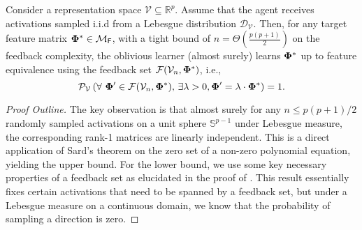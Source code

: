 
    

\begin{theorem}\label{thm: samplegeneral}
    Consider a representation space \( \mathcal{V} \subseteq \mathbb{R}^p \). Assume that the agent receives activations sampled i.i.d from a Lebesgue distribution \( \mathcal{D}_{\mathcal{V}} \). Then, for any target feature matrix \( \boldsymbol{\Phi}^* \in \mathcal{M}_{\textsf{F}} \), with a tight bound of \( n = \Theta\left(\frac{p(p+1)}{2}\right) \) on the feedback complexity, the oblivious learner (almost surely) learns \( \boldsymbol{\Phi}^* \) up to feature equivalence using the feedback set \( \mathcal{F}(\mathcal{V}_n,\boldsymbol{\Phi}^*) \), i.e.,
    \[
        \mathcal{P}_{\mathcal{V}} \left( \forall\,\, \boldsymbol{\Phi}' \in \mathcal{F}(\mathcal{V}_n,\boldsymbol{\Phi}^*),\, \exists \lambda > 0, \boldsymbol{\Phi}' = \lambda \cdot \boldsymbol{\Phi}^* \right) = 1.
    \]
\end{theorem}
\begin{proof}[Proof Outline] The key observation is that almost surely for any $n \le p(p+1)/2$ randomly sampled activations on a unit sphere $\mathbb{S}^{p-1}$ under Lebesgue measure, the corresponding rank-1 matrices are linearly independent. This is a direct application of Sard's theorem on the zero set of a non-zero polynomial equation, yielding the upper bound. For the lower bound, we use some key necessary properties of a feedback set as elucidated in the proof of . This result essentially fixes certain activations that need to be spanned by a feedback set, but under a Lebesgue measure on a continuous domain, we know that the probability of sampling a direction is zero.
\end{proof}

